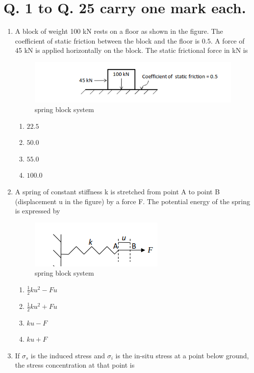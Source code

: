 \documentclass[journal,12pt,onecolumn]{IEEEtran}
\theoremstyle{remark}
\begin{document}
\section*{Q. 1 to Q. 25 carry one mark each.}
\begin{enumerate}
\item A block of weight 100 kN rests on a floor as shown in the figure. The coefficient of static friction between the block and the floor is $0.5$. A force of 45 kN is applied horizontally on the block. The static frictional force in kN is
\begin{figure}[H]
  \centering
  \includegraphics[width=0.4\columnwidth]{figs/spring block.png}
  \caption{spring block system}
  \label{fig:block}
\end{figure}


\hfill{}
\begin{multicols}{4}
\begin{enumerate}
\item $22.5$
\item $50.0$
\item $55.0 $
\item $100.0$
\end{enumerate}
\end{multicols}
\item A spring of constant stiffness k is stretched from point A to point B (displacement u in the figure) by a force F. The potential energy of the spring is expressed by
\begin{figure}[H]
  \centering
  \includegraphics[width=0.4\columnwidth]{figs/spring2.png}
  \caption{spring block system}
  \label{fig:spring}
\end{figure}

\hfill{}
\begin{multicols}{2}
\begin{enumerate}
\item $\frac{1}{2}ku^2 - Fu$
\item $\frac{1}{2}ku^2 + Fu$
\item $ku-F$
\item $ku+F$
\end{enumerate}
\end{multicols}
\item If $\sigma_s$ is the induced stress and $\sigma_i$ is the in-situ stress at a point below ground, the stress concentration at that point is


\end{enumerate}
\end{document}
